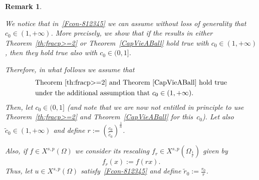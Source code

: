 \documentclass[12pt]{article}
\numberwithin{equation}{section}
\newtheorem{rem}[thm]{Remark}
\begin{document}
\begin{rem}\label{plothgnebvdf} {\rm
We notice that in~\eqref{Fcon-812345} we can assume without loss of generality that $c_0\in (1,+\infty)$. More precisely, we show that if the results in either Theorem~\ref{th:fracp>=2} or Theorem~\ref{CapVieABall} hold true with $c_0\in (1,+\infty)$, then they hold true also with $c_0\in (0,1]$. 

Therefore, in what follows we assume that
\begin{equation}\label{kilimoner}\begin{split}&
{\mbox{Theorem~\ref{th:fracp>=2} and Theorem~\ref{CapVieABall} hold true}}\\&{\mbox{under the additional assumption that $c_0\in (1,+\infty)$.}} \end{split}
\end{equation}
Then, let $c_0\in (0,1]$
(and note that we are now not entitled in principle to use
Theorem~\ref{th:fracp>=2} and Theorem~\ref{CapVieABall} for this~$c_0$). Let also~$\tilde{c}_0\in (1,+\infty)$  and define $r:=\left(\frac{c_0}{\tilde{c}_0}\right)^\frac{1}{n}$. 

Also, if $f\in X^{s,p}(\Omega)$ we consider its rescaling $f_r\in X^{s,p}\left(\Omega_\frac{1}{r}\right)$ given by
\begin{equation*}
f_r(x):=f(r x).
\end{equation*}
Thus, let $u\in X^{s,p}(\Omega)$ satisfy~\eqref{Fcon-812345} and define $\tilde{r}_0:=\frac{r_0}{r}$.

}
\end{rem}
\end{document}
